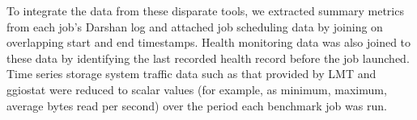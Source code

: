 To integrate the data from these disparate tools, we extracted summary metrics from each job's Darshan log and attached job scheduling data by joining on overlapping start and end timestamps.
Health monitoring data was also joined to these data by identifying the last recorded health record before the job launched.
Time series storage system traffic data such as that provided by LMT and ggiostat were reduced to scalar values (for example, as minimum, maximum, average bytes read per second) over the period each benchmark job was run.



